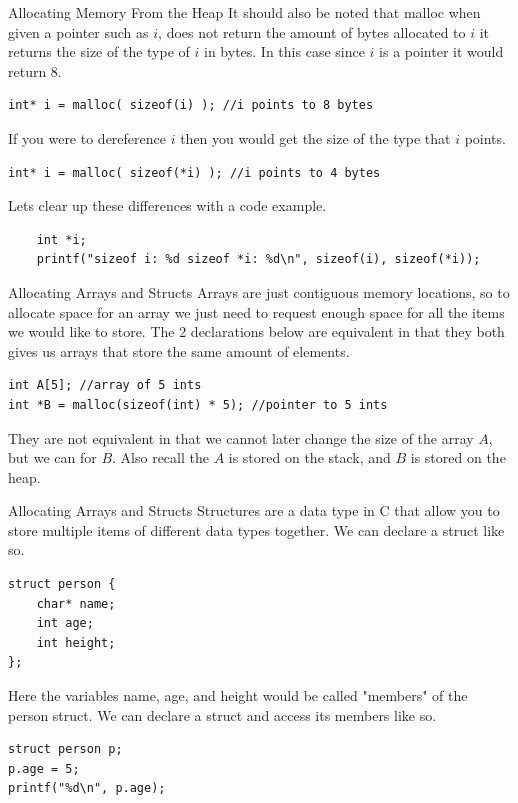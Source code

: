 \documentclass{beamer}
\begin{document}
\begin{frame}[fragile]{Allocating Memory From the Heap}
It should also be noted that malloc when given a pointer such as $i$, does not return the amount of bytes allocated to $i$ it returns the size of the type of $i$ in bytes. In this case since $i$ is a pointer it would return 8.
\begin{verbatim}
int* i = malloc( sizeof(i) ); //i points to 8 bytes
\end{verbatim} 
If you were to dereference $i$ then you would get the size of the type that $i$ points.
\begin{verbatim}
int* i = malloc( sizeof(*i) ); //i points to 4 bytes
\end{verbatim} 

Lets clear up these differences with a code example.
\begin{verbatim}
    int *i;
    printf("sizeof i: %d sizeof *i: %d\n", sizeof(i), sizeof(*i));
\end{verbatim} 

\end{frame}

\begin{frame}[fragile]{Allocating Arrays and Structs}
Arrays are just contiguous memory locations, so to allocate space for an array we just need to request enough space for all the items we would like to store.
The 2 declarations below are equivalent in that they both gives us arrays that store the same amount of elements.
\begin{verbatim}
int A[5]; //array of 5 ints
int *B = malloc(sizeof(int) * 5); //pointer to 5 ints
\end{verbatim}
They are not equivalent in that we cannot later change the size of the array $A$, but we can for $B$. Also recall the $A$ is stored on the stack, and $B$ is stored on the heap.
\end{frame}

\begin{frame}[fragile]{Allocating Arrays and Structs}
Structures are a data type in C that allow you to store multiple items of different data types together. We can declare a struct like so.
\begin{verbatim}
struct person {
	char* name;
	int age;
	int height;
};
\end{verbatim}
Here the variables name, age, and height would be called "members" of the person struct. We can declare a struct and access its members like so.
\begin{verbatim}
struct person p;
p.age = 5;
printf("%d\n", p.age);
\end{verbatim}


\end{frame}
\end{document}
